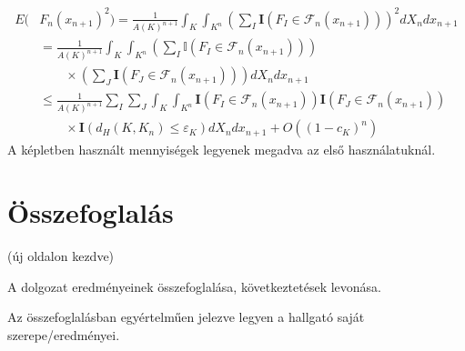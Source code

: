 \documentclass[a4paper,12pt]{report}
\theoremstyle{definition}
\theoremstyle{remark}
\begin{document}
\begin{align}
E (& F_n(x_{n+1})^2) = \frac 1{A(K)^{n+1}}\int_K\int_{K^n} \left (\sum_I \mathbf I (F_I\in\mathcal F_{n}(x_{n+1}))\right )^2 d X_n d x_{n+1}\nonumber\\
& = \frac 1{A(K)^{n+1}} \int_K\int_{K^n} \left (\sum_I \mathbb I (F_I\in\mathcal F_{n}(x_{n+1}))\right ) \nonumber \\
& \quad \quad \times \left (\sum_J \mathbf I (F_J\in\mathcal F_{n}(x_{n+1}))\right ) d X_n d x_{n+1}\nonumber\\
&\leq \frac 1{A(K)^{n+1}}\sum_I\sum_J \int_K\int_{K^n} \mathbf I (F_I\in\mathcal F_{n}(x_{n+1}))
\mathbf I (F_J\in\mathcal F_{n}(x_{n+1}))\nonumber\\
&\quad\quad\times\mathbf I(d_H(K,K_n)\leq\varepsilon_K) d X_n d x_{n+1}
+O((1-c_K)^n)\label{ineq1}
\end{align}
A képletben használt mennyiségek legyenek megadva az első használatuknál.
\chapter{Összefoglalás}

(új oldalon kezdve)

A dolgozat eredményeinek összefoglalása, következtetések levonása.

Az összefoglalásban egyértelműen jelezve legyen a hallgató saját szerepe/eredményei.





\newpage
\begin{bibdiv}
\begin{biblist}







\end{biblist}
\end{bibdiv}
\end{document}
